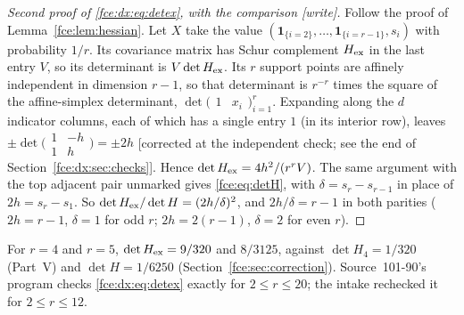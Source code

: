\documentclass[11pt,a4paper]{article}
\numberwithin{equation}{section}
\theoremstyle{definition}\newtheorem{definition}[theorem]{Definition}
\theoremstyle{remark}\newtheorem{remark}[theorem]{Remark}
\begin{document}
\begin{proof}[Second proof of \eqref{fce:dx:eq:detex}, with the comparison \textup{[write]}]
Follow the proof of Lemma~\ref{fce:lem:hessian}. Let $X$ take the value
$(\boldsymbol1_{\{i=2\}},\ldots,\boldsymbol1_{\{i=r-1\}},s_i)$ with
probability $1/r$. Its covariance matrix has Schur complement $H_{\rm ex}$
in the last entry $V$, so its determinant is $V\det H_{\rm ex}$. Its $r$
support points are affinely independent in dimension $r-1$, so that
determinant is $r^{-r}$ times the square of the affine-simplex determinant,
$\det\bigl(\begin{smallmatrix}1&x_i\end{smallmatrix}\bigr)_{i=1}^r$. Expanding
along the $d$ indicator columns, each of which has a single entry $1$ (in its
interior row), leaves
$\pm\det\bigl(\begin{smallmatrix}1&-h\\1&h\end{smallmatrix}\bigr)=\pm2h$
\textup{[}corrected at the independent check; see the end of
Section~\ref{fce:dx:sec:checks}\textup{]}.
Hence $\det H_{\rm ex}=4h^2/(r^rV)$. The same argument with the top adjacent
pair unmarked gives \eqref{fce:eq:detH}, with $\delta=s_r-s_{r-1}$ in place
of $2h=s_r-s_1$. So $\det H_{\rm ex}/\det H=(2h/\delta)^2$, and $2h/\delta=r-1$
in both parities ($2h=r-1$, $\delta=1$ for odd $r$; $2h=2(r-1)$, $\delta=2$
for even $r$).
\end{proof}
For $r=4$ and $r=5$, $\det H_{\rm ex}=9/320$ and $8/3125$, against
$\det H_4=1/320$ (Part~V) and $\det H=1/6250$ (Section~\ref{fce:sec:correction}).
Source~101-90's program checks \eqref{fce:dx:eq:detex} exactly for
$2\le r\le20$; the intake rechecked it for $2\le r\le12$.
\end{document}
